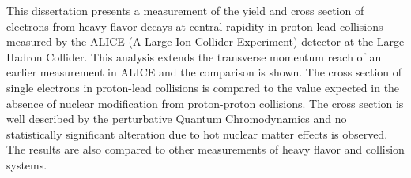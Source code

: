 This dissertation presents a measurement of the yield and cross section of electrons from heavy flavor decays at central rapidity in proton-lead collisions measured by the ALICE (A Large Ion Collider Experiment) detector at the Large Hadron Collider. This analysis extends the transverse momentum reach of an earlier measurement in ALICE and the comparison is shown. The cross section of single electrons in proton-lead collisions is compared to the value expected in the absence of nuclear modification from proton-proton collisions. The cross section is well described by the perturbative Quantum Chromodynamics and no statistically significant alteration due to hot nuclear matter effects is observed.  The results are also compared to other measurements of heavy flavor and collision systems. 
 





